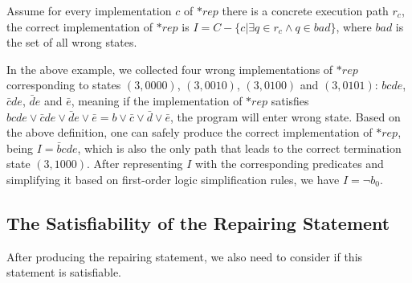 \begin{definition}
\label{definition:CorrentREP}
Assume for every implementation $c$ of $*rep$ there is a concrete execution path $r_{c}$, the correct implementation of $*rep$ is $I = C - \{c | \exists q \in r_{c} \wedge q \in bad\}$, where $bad$ is the set of all wrong states.
\end{definition}

In the above example, we collected four wrong implementations of $*rep$ corresponding to states $(3,0000)$, $(3,0010)$, $(3,0100)$ and $(3,0101)$: $bcde$, $\bar{c}de$, $\bar{d}e$ and $\bar{e}$,
meaning if the implementation of $*rep$ satisfies $bcde \vee \bar{c}de \vee \bar{d}e \vee \bar{e} = b \vee \bar{c} \vee \bar{d} \vee \bar{e}$, the program will enter wrong state.
Based on the above definition, one can safely produce the correct implementation of $*rep$, being $I = \bar{b}cde$, which is also the only path that leads to the correct termination state $(3,1000)$.
After representing $I$ with the corresponding predicates and simplifying it based on first-order logic simplification rules, we have $I = \neg b_{0}$.

\subsection{The Satisfiability of the Repairing Statement}
\label{section:TheSatisfiabilityOfTheRepairingStatement}
After producing the repairing statement, we also need to consider if this statement is satisfiable.

